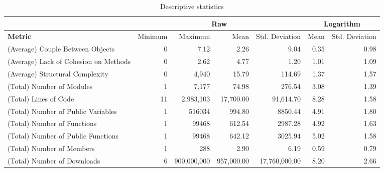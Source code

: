 \documentclass[conference]{IEEEtran}
\begin{document}
\begin{center}
\begin{table}[hbt]
\centering \caption{Descriptive statistics}
\begin{tabular}{|l|r|r|r|r|r|r|} \hline
  & \multicolumn{4}{|c|}{Raw} & \multicolumn{2}{|c|}{Logarithm}\\ \hline

\textbf{Metric} 	    & Minimum & Maximum        & Mean      & Std. Deviation & Mean & Std. Deviation \\ \hline

(Average) Couple Between Objects      & 0    & 7.12        & 2.26      & 9.04           & 0.35 & 0.98 \\ \hline

(Average) Lack of Cohesion on Methods & 0    & 2.62        & 4.77      & 1.20           & 1.01 & 1.09 \\ \hline

(Average) Structural Complexity       & 0    & 4,940       & 15.79     & 114.69         & 1.37 & 1.57 \\ \hline

(Total) Number of Modules           & 1    & 7,177       & 74.98     & 276.54         & 3.08 & 1.39 \\ \hline

(Total) Lines of Code               & 11   & 2,983,103   & 17,700.00 & 91,614.70      & 8.28 & 1.58 \\ \hline

(Total) Number of Public Variables  & 1    & 516034      & 994.80    & 8850.44        & 4.91 & 1.80 \\ \hline

(Total) Number of Functions	    & 1    & 99468       & 612.54    & 2987.28        & 4.92 & 1.63 \\ \hline

(Total) Number of Public Functions  & 1    & 99468       & 642.12    & 3025.94        & 5.02 & 1.58 \\ \hline

(Total) Number of Members           & 1    & 288         & 2.90       & 6.19          & 0.59 & 0.79 \\ \hline

(Total) Number of Downloads         & 6    & 900,000,000   & 957,000.00 & 17,760,000.00 & 8.20 & 2.66 \\ \hline

\end{tabular}
\label{table:statistics}
\end{table}
\end{center}
\end{document}
